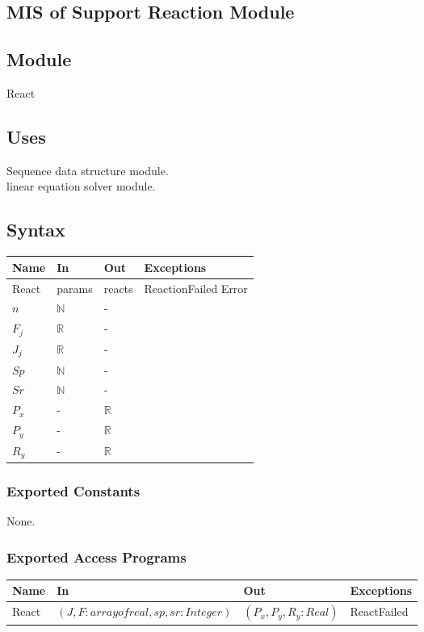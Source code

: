 \documentclass[12pt, titlepage]{article}
\begin{document}
\subsection{MIS of Support Reaction Module \label{mSpec} }

\subsection{Module}

React

\subsection{Uses}
Sequence data structure module.\\
linear equation solver module.\\

\subsection{Syntax}
\begin{tabular}{p{3cm} p{1cm} p{1cm} >{\raggedright\arraybackslash}p{9cm}}
\toprule
\textbf{Name} & \textbf{In} & \textbf{Out} & \textbf{Exceptions} \\
\midrule
React & params & reacts &  ReactionFailed Error \\

$n$ &  $\mathbb{N}$&-\\
$F_j$ &  $\mathbb{R}$&-\\
$J_j$ &  $\mathbb{R}$&-\\
$Sp$ &  $\mathbb{N}$&-\\
$Sr$ &  $\mathbb{N}$ &-\\
$P_x$ & - & $\mathbb{R}$\\
$P_y$ & - & $\mathbb{R}$\\
$R_y$ & - & $\mathbb{R}$\\

\bottomrule
\end{tabular}
\subsubsection{Exported Constants}
None.
\subsubsection{Exported Access Programs}
\begin{center}
\begin{tabular}{p{2cm} p{4cm} p{4cm} p{2cm}}
\hline
\textbf{Name} & \textbf{In} & \textbf{Out} & \textbf{Exceptions} \\
\hline
React& $(J,F: array of real,sp,sr: Integer)$ & $(P_x,P_y,R_y: Real)$ & ReactFailed \\
\hline
\end{tabular}
\end{center}
\end{document}
